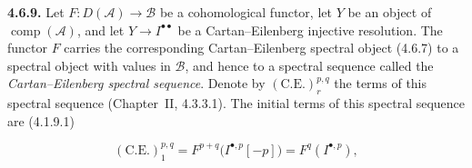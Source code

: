\medskip\noindent\textbf{4.6.9.}\quad
Let $F\colon D(\mathcal A)\longrightarrow\mathcal B$ be a cohomological
functor, let $Y$ be an object of $\operatorname{comp}(\mathcal A)$, and
let $Y\longrightarrow I^{\bullet\bullet}$ be a Cartan--Eilenberg
injective resolution. The functor $F$ carries the corresponding
Cartan--Eilenberg spectral object (4.6.7) to a spectral object with values
in $\mathcal B$, and hence to a spectral sequence called the
\emph{Cartan--Eilenberg spectral sequence}. Denote by
$(\mathrm{C.E.})_r^{p,q}$ the terms of this spectral sequence
(Chapter~II, 4.3.3.1). The initial terms of this spectral sequence are
(4.1.9.1)

\[
(\mathrm{C.E.})_1^{p,q}
=F^{p+q}\bigl(I^{\bullet,p}[-p]\bigr)
=F^q(I^{\bullet,p}),
\]
\endgroup

